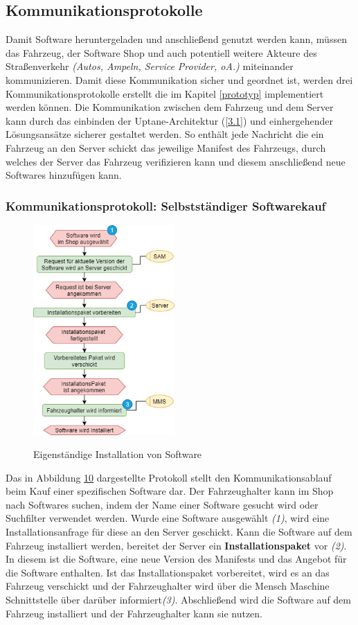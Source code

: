 \subsection{Kommunikationsprotokolle}\label{4.2}
Damit Software heruntergeladen und anschließend genutzt werden kann, müssen das Fahrzeug, der Software Shop und auch potentiell weitere Akteure des Straßenverkehr \textit{(Autos, Ampeln, Service Provider, oA.)} miteinander kommunizieren. Damit diese Kommunikation sicher und geordnet ist, werden drei Kommunikationsprotokolle erstellt die im Kapitel \ref{prototyp} implementiert werden können. Die Kommunikation zwischen dem Fahrzeug und dem Server kann durch das einbinden der Uptane-Architektur (\ref{3.1}) und einhergehender Lösungsansätze sicherer gestaltet werden. So enthält jede Nachricht die ein Fahrzeug an den Server schickt das jeweilige Manifest des Fahrzeugs, durch welches der Server das Fahrzeug verifizieren kann und diesem anschließend neue Softwares hinzufügen kann.

\subsubsection{Kommunikationsprotokoll: Selbstständiger Softwarekauf}
\begin{figure}
	\centering
	\includegraphics[width=0.48\textwidth]{pictures/konzept-Eigene-Installation.png}	\label{img:eigenstaendigIns}
	\caption{Eigenständige Installation von Software}
\end{figure}
Das in Abbildung \hyperref[img:eigenstaendigIns]{10} dargestellte Protokoll stellt den Kommunikationsablauf beim Kauf einer spezifischen Software dar. Der Fahrzeughalter kann im Shop nach Softwares suchen, indem der Name einer Software gesucht wird oder Suchfilter verwendet werden. Wurde eine Software ausgewählt \textit{(1)}, wird eine Installationsanfrage für diese an den Server geschickt. Kann die Software auf dem Fahrzeug installiert werden, bereitet der Server ein \textbf{Installationspaket} vor \textit{(2)}. In diesem ist die Software, eine neue Version des Manifests und das Angebot für die Software enthalten. Ist das Installationspaket vorbereitet, wird es an das Fahrzeug verschickt und der Fahrzeughalter wird über die Mensch Maschine Schnittstelle über darüber informiert\textit{(3)}. Abschließend wird die Software auf dem Fahrzeug installiert und der Fahrzeughalter kann sie nutzen.
\clearpage
